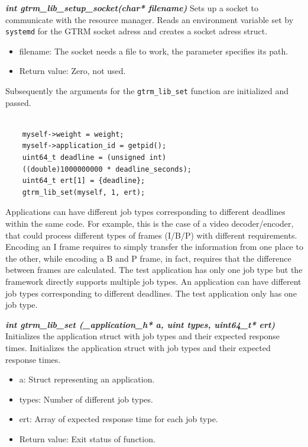 \documentclass[nobiblatex]{LTHthesis}
\begin{document}
\begin{framed}
	\begin{flushleft}		
		\emph{\textbf{{int gtrm\_lib\_setup\_socket(char* filename)}}}
		Sets up a socket to communicate with the resource manager. 
	Reads an environment variable set by \texttt{systemd} for the GTRM
	socket adress and creates a socket adress struct.
		\begin{itemize}
		\item filename: The socket needs a file to work, the parameter 
	  specifies its path.
		\item Return value: Zero, not used.
		\end{itemize}
	\end{flushleft}
\end{framed}

Subsequently the arguments for the \texttt{gtrm\_lib\_set} function
are initialized and passed.
\begin{lstlisting}	

	myself->weight = weight;
	myself->application_id = getpid();
	uint64_t deadline = (unsigned int) 
	((double)1000000000 * deadline_seconds);
	uint64_t ert[1] = {deadline};
	gtrm_lib_set(myself, 1, ert);
\end{lstlisting}
Applications can have different job types corresponding to different 
deadlines within the same code. For example, this is the case of a video
decoder/encoder, that could process different types of frames (I/B/P)
with different requirements. Encoding an I frame requires to simply
transfer the information from one place to the other, while encoding a B and
P frame, in fact, requires that the difference between frames are calculated.
The test application has only one job type but the framework directly supports multiple job types. 
An application can have different job types corresponding to different deadlines. The test application only has one job type. 

\begin{framed}
	\begin{flushleft}		
		\emph{\textbf{{int gtrm\_lib\_set
	(\_application\_h* a, uint types, uint64\_t* ert)}}} \newline
		Initializes the application struct with job types and their 
	expected response times.
		Initializes the application struct with job types and their expected response times.
		\begin{itemize}
		  \item a: Struct representing an application.
		  \item types: Number of different job types.
		  \item ert: Array of expected response time for each job type.
		  \item Return value: Exit status of function.
	\end{itemize}
  \end{flushleft}
\end{framed}
\end{document}
